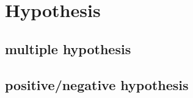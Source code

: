\section{Hypothesis}




\subsection{multiple hypothesis}
\subsection{positive/negative hypothesis}
